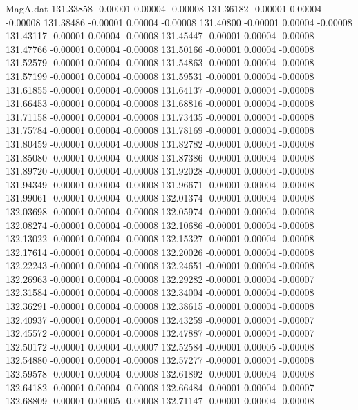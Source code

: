 \begin{filecontents}{MagA.dat}
 131.33858   -0.00001    0.00004   -0.00008
 131.36182   -0.00001    0.00004   -0.00008
 131.38486   -0.00001    0.00004   -0.00008
 131.40800   -0.00001    0.00004   -0.00008
 131.43117   -0.00001    0.00004   -0.00008
 131.45447   -0.00001    0.00004   -0.00008
 131.47766   -0.00001    0.00004   -0.00008
 131.50166   -0.00001    0.00004   -0.00008
 131.52579   -0.00001    0.00004   -0.00008
 131.54863   -0.00001    0.00004   -0.00008
 131.57199   -0.00001    0.00004   -0.00008
 131.59531   -0.00001    0.00004   -0.00008
 131.61855   -0.00001    0.00004   -0.00008
 131.64137   -0.00001    0.00004   -0.00008
 131.66453   -0.00001    0.00004   -0.00008
 131.68816   -0.00001    0.00004   -0.00008
 131.71158   -0.00001    0.00004   -0.00008
 131.73435   -0.00001    0.00004   -0.00008
 131.75784   -0.00001    0.00004   -0.00008
 131.78169   -0.00001    0.00004   -0.00008
 131.80459   -0.00001    0.00004   -0.00008
 131.82782   -0.00001    0.00004   -0.00008
 131.85080   -0.00001    0.00004   -0.00008
 131.87386   -0.00001    0.00004   -0.00008
 131.89720   -0.00001    0.00004   -0.00008
 131.92028   -0.00001    0.00004   -0.00008
 131.94349   -0.00001    0.00004   -0.00008
 131.96671   -0.00001    0.00004   -0.00008
 131.99061   -0.00001    0.00004   -0.00008
 132.01374   -0.00001    0.00004   -0.00008
 132.03698   -0.00001    0.00004   -0.00008
 132.05974   -0.00001    0.00004   -0.00008
 132.08274   -0.00001    0.00004   -0.00008
 132.10686   -0.00001    0.00004   -0.00008
 132.13022   -0.00001    0.00004   -0.00008
 132.15327   -0.00001    0.00004   -0.00008
 132.17614   -0.00001    0.00004   -0.00008
 132.20026   -0.00001    0.00004   -0.00008
 132.22243   -0.00001    0.00004   -0.00008
 132.24651   -0.00001    0.00004   -0.00008
 132.26963   -0.00001    0.00004   -0.00008
 132.29282   -0.00001    0.00004   -0.00007
 132.31584   -0.00001    0.00004   -0.00008
 132.34004   -0.00001    0.00004   -0.00008
 132.36291   -0.00001    0.00004   -0.00008
 132.38615   -0.00001    0.00004   -0.00008
 132.40937   -0.00001    0.00004   -0.00008
 132.43259   -0.00001    0.00004   -0.00007
 132.45572   -0.00001    0.00004   -0.00008
 132.47887   -0.00001    0.00004   -0.00007
 132.50172   -0.00001    0.00004   -0.00007
 132.52584   -0.00001    0.00005   -0.00008
 132.54880   -0.00001    0.00004   -0.00008
 132.57277   -0.00001    0.00004   -0.00008
 132.59578   -0.00001    0.00004   -0.00008
 132.61892   -0.00001    0.00004   -0.00008
 132.64182   -0.00001    0.00004   -0.00008
 132.66484   -0.00001    0.00004   -0.00007
 132.68809   -0.00001    0.00005   -0.00008
 132.71147   -0.00001    0.00004   -0.00008

\end{filecontents}
